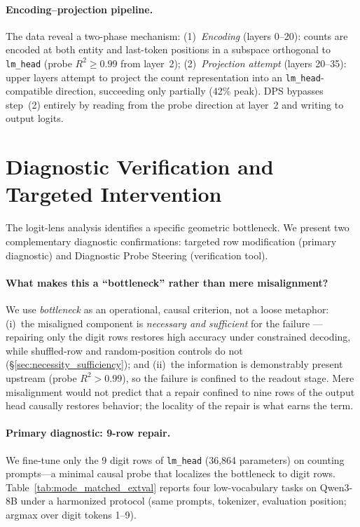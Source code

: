 \documentclass{article}
\begin{document}
\paragraph{Encoding--projection pipeline.}
The data reveal a two-phase mechanism: (1)~\emph{Encoding} (layers 0--20):
counts are encoded at both entity and last-token positions in a subspace
orthogonal to \texttt{lm\_head} (probe $R^2 \geq 0.99$ from layer~2);
(2)~\emph{Projection attempt} (layers 20--35): upper layers attempt to project
the count representation into an \texttt{lm\_head}-compatible direction,
succeeding only partially (42\% peak). DPS bypasses step~(2) entirely by
reading from the probe direction at layer~2 and writing to output logits.

\section{Diagnostic Verification and Targeted Intervention}
\label{sec:dps}

The logit-lens analysis identifies a specific geometric bottleneck. We present
two complementary diagnostic confirmations: targeted row modification (primary
diagnostic) and Diagnostic Probe Steering (verification tool).

\paragraph{What makes this a ``bottleneck'' rather than mere misalignment?}
We use \emph{bottleneck} as an operational, causal criterion, not a loose
metaphor: (i)~the misaligned component is \emph{necessary and sufficient} for
the failure --- repairing only the digit rows restores high accuracy under
constrained decoding, while shuffled-row and random-position controls do not
(\S\ref{sec:necessity_sufficiency}); and (ii)~the information is demonstrably
present upstream (probe $R^2 > 0.99$), so the failure is confined to the
readout stage. Mere misalignment would not predict that a repair confined to
nine rows of the output head causally restores behavior; the locality of the
repair is what earns the term.

\paragraph{Primary diagnostic: 9-row repair.}
We fine-tune only the 9 digit rows of \texttt{lm\_head} (36,864 parameters) on
counting prompts---a minimal causal probe that localizes the bottleneck to
digit rows. Table~\ref{tab:mode_matched_extval} reports four low-vocabulary
tasks on Qwen3-8B under a harmonized protocol (same prompts, tokenizer,
evaluation position; argmax over digit tokens 1--9).
\end{document}

